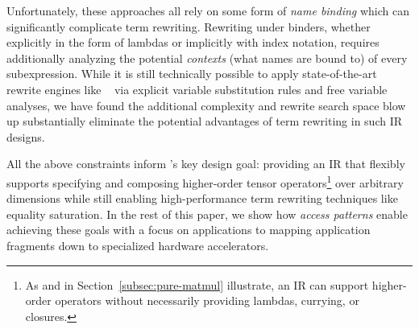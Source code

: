 Unfortunately, these approaches all rely on some
  form of \textit{name binding} which can
  significantly complicate term rewriting.
Rewriting under binders,
  whether explicitly in the form of lambdas
  or implicitly with index notation,
  requires additionally analyzing the
  potential \textit{contexts}
  (what names are bound to)
  of every subexpression.
While it is still technically possible to
  apply state-of-the-art rewrite engines
  like ~\cite{willsey2021egg}
  via explicit variable substitution rules and
  free variable analyses,
  we have found the additional complexity
  and rewrite search space blow up
  substantially eliminate the potential advantages
  of term rewriting in such IR designs.

All the above constraints inform \g's key design goal:
  providing an IR that flexibly supports specifying and
  composing higher-order tensor operators\footnote{
    As  and  in 
    Section~\ref{subsec:pure-matmul} illustrate,
    an IR can support higher-order operators without
    necessarily providing lambdas, currying, or closures.}
  over arbitrary dimensions while still enabling
  high-performance term rewriting techniques
  like equality saturation.
In the rest of this paper,
  we show how \textit{access patterns} enable achieving
  these goals with a focus on applications to
  mapping application fragments down to
  specialized hardware accelerators.


  








